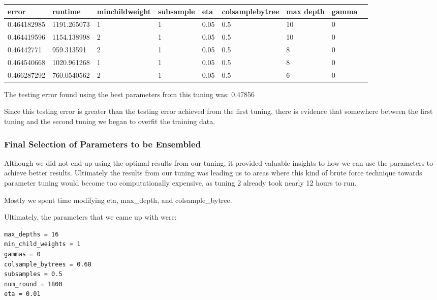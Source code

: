 \documentclass[twoside,11pt]{article}
\theoremstyle{definition}
\begin{document}
      \begin{center}
          \begin{tabular}{ | l | l | l | l | l | l | l | l | p{5cm} |}
          \hline
          error & runtime & minchildweight & subsample & eta & colsamplebytree & max depth & gamma \\ \hline
          0.464182985 & 1191.265073 & 1 & 1 & 0.05 & 0.5 & 10 & 0 \\ \hline
          0.464419596 & 1154.138998 & 2 & 1 & 0.05 & 0.5 & 10 & 0 \\ \hline
          0.46442771 & 959.313591 & 2 & 1 & 0.05 & 0.5 & 8 & 0 \\ \hline
          0.464540668 & 1020.961268 & 1 & 1 & 0.05 & 0.5 & 8 & 0 \\ \hline
          0.466287292 & 760.0540562 & 2 & 1 & 0.05 & 0.5 & 6 & 0 \\ \hline
          \end{tabular}
      \end{center}

      The testing error found using the best parameters from this tuning was: 0.47856

      Since this testing error is greater than the testing error achieved from the first tuning, there is evidence that somewhere between the first tuning and the second tuning we began to overfit the training data.

    \subsubsection{Final Selection of Parameters to be Ensembled}

      Although we did not end up using the optimal results from our tuning, it provided valuable insights to how we can use the parameters to achieve better results. Ultimately the results from our tuning was leading us to areas where this kind of brute force technique towards parameter tuning would become too computationally expensive, as tuning 2 already took nearly 12 hours to run.

      Mostly we spent time modifying eta, max\_depth, and colsample\_bytree.

      Ultimately, the parameters that we came up with were:
      \begin{lstlisting}
max_depths = 16
min_child_weights = 1
gammas = 0
colsample_bytrees = 0.68
subsamples = 0.5
num_round = 1800
eta = 0.01
      \end{lstlisting}
\end{document}
